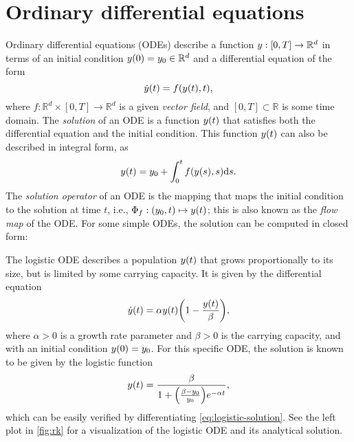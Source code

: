 \documentclass{mimosis}
\begin{document}
\section{Ordinary differential equations}
\label{sec:orge5cc0ad}
Ordinary differential equations (ODEs)
describe a function
\(y: [0, T] \to \mathbb{R}^d\)
in terms of
an initial condition \(y(0) = y_0 \in \mathbb{R}^d\)
and a differential equation of the form
\begin{equation}
  \dot{\val}(t) = \vf(\val(t), t),
\end{equation}
where \(f: \mathbb{R}^d \times [0, T] \to \mathbb{R}^d\)
is a given \emph{vector field}, and
\([0, T] \subset \mathbb{R}\) is some time domain.
The \emph{solution} of an ODE is a function \(y(t)\) that satisfies both the differential equation and the initial condition.
This function \(y(t)\) can also be described in integral form, as
\begin{equation}
  \label{eq:ode-solution}
  \val(t) = \val_0 + \int_0^t \vf(\val(s), s) \dd s.
\end{equation}
The \emph{solution operator} of an ODE is the mapping that maps the initial condition to the solution at time \(t\), i.e., \(\Phi_f: (y_0, t) \mapsto y(t)\); this is also known as the \emph{flow map} of the ODE.
For some simple ODEs, the solution can be computed in closed form:

\begin{exmple}
The logistic ODE describes a population \(y(t)\) that grows proportionally to its size, but is limited by some carrying capacity.
It is given by the differential equation
\begin{equation}
  \dot{\val}(t) = \alpha \val(t) \left(1 - \frac{\val(t)}{\beta} \right),
\end{equation}
where \(\alpha > 0\) is a growth rate parameter and \(\beta>0\) is the carrying capacity,
and with an initial condition \(y(0) = y_0\).
For this specific ODE, the solution is known to be given by the logistic function
\begin{equation}
  \label{eq:logistic-solution}
  \val(t) = \frac{\beta}{1 + \left( \frac{\beta - \val_0}{\val_0} \right) e^{-\alpha t}},
\end{equation}
which can be easily verified by differentiating \cref{eq:logistic-solution}.
See the left plot in \cref{fig:rk} for a visualization of the logistic ODE and its analytical solution.
\label{example:logistic-ode}
\end{exmple}
\end{document}
